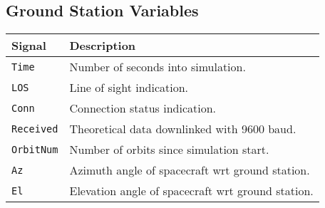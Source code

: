\begin{comment}
Current":0.40367200000000003,"LI 3V3 Voltage":3.302,"LI VBATT Current":-0.19264799999999999,"LI VBATT Voltage":8.243400000000001,"Lithium #RX":0,"Lithium #TX":261648,"Lithium MSP430 Temp":0,"Lithium Op Count":11731,"Lithium PA Temp":22.85666520419977,"Lithium RSSI":97,"NumResets":548, "5VSbVolt":5.1200,"5VSbCurr":.0008,"3.3VSbVolt":3.3160,"3.3VSbCurr":.0005,"1.5VSbVolt"1.4930,"1.5VSbCurr":.0004,"Operation Mode":0,"Output Regulator Temperature":24.662146180000008,"PIM 3v3 current":-0.129,"PIM 3v3 voltage":0,"PIM VBatt monitor":0,"RTC Unix Time":1579207577,"SD Usage":0,"SD V (?)":0,"STAMP GPIO States":29809,"TBEx Payload Current":-0.227,"TBEx Payload Voltage":0,"avgNumActiveTasks1":1.64,"avgNumActiveTasks15":1.81,"avgNumActiveTasks5":1.82,"data_checksum_passed":true,"flag":3,"freeMemPlusCache":107632,"header_checksum_passed":true,"pid":0,"sid":83,"telemetry_archive":false,"telemetry_archive_file_num":0,"totNumProcesses":41,"usedMemMinusCache":19272}}
\end{lstlisting}

\end{comment}

\subsection{Ground Station Variables}

\begin{table}[!h]
\centering
\begin{tabular}{ll} 
\hline\hline
\textbf{Signal} & \textbf{Description}                               \\ 
\hline
\texttt{Time}            & Number of seconds into simulation.                 \\
\texttt{LOS}             & Line of sight indication.                          \\
\texttt{Conn}            & Connection status indication.                      \\
\texttt{Received}        & Theoretical data downlinked with 9600 baud.        \\
\texttt{OrbitNum}        & Number of orbits since simulation start.           \\
\texttt{Az}              & Azimuth angle of spacecraft wrt ground station.    \\
\texttt{El}              & Elevation angle of spacecraft wrt ground station.  \\
\hline\hline
\end{tabular}
\end{table}

